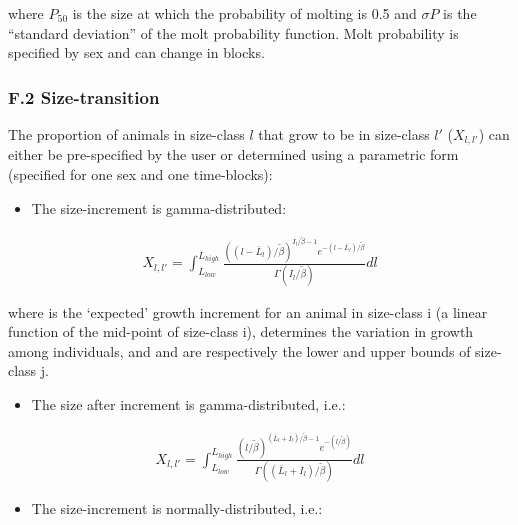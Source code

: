 \documentclass[]{article}
\providecommand{\tightlist}{%
  \setlength{\itemsep}{0pt}\setlength{\parskip}{0pt}}
\begin{document}
where \(P_{50}\) is the size at which the probability of molting is 0.5
and \(\sigma{P}\) is the ``standard deviation'' of the molt probability
function. Molt probability is specified by sex and can change in blocks.

\subsubsection{F.2 Size-transition}\label{f.2-size-transition}

The proportion of animals in size-class \(l\) that grow to be in
size-class \(l'\) (\(X_{l,l'}\)) can either be pre-specified by the user
or determined using a parametric form (specified for one sex and one
time-blocks):

\begin{itemize}
\tightlist
\item
  The size-increment is gamma-distributed:
\end{itemize}

\begin{align}

 X_{l,l'} = \int_{L_{low}}^{L_{high}} \frac {((l-\bar{L}_{l})/\tilde{\beta})^{I_{l}/\tilde{\beta}-1} e^{-(l-\bar{L}_{l})/\tilde{\beta}}}
                                          {\Gamma( I_{l}/\tilde{\beta})} dl

 \end{align}

where is the `expected' growth increment for an animal in size-class i
(a linear function of the mid-point of size-class i), determines the
variation in growth among individuals, and and are respectively the
lower and upper bounds of size-class j.

\begin{itemize}
\tightlist
\item
  The size after increment is gamma-distributed, i.e.:
\end{itemize}

\begin{align}

 X_{l,l'} = \int_{L_{low}}^{L_{high}} \frac {(l/\tilde{\beta})^{(\bar{L}_{l} +I_{l})/\tilde{\beta}-1} e^{-(l/\tilde{\beta})}}
                                          {\Gamma((\bar{L}_{l}+I_{l})/\tilde{\beta})} dl

 \end{align}

\begin{itemize}
\tightlist
\item
  The size-increment is normally-distributed, i.e.:
\end{itemize}
\end{document}
